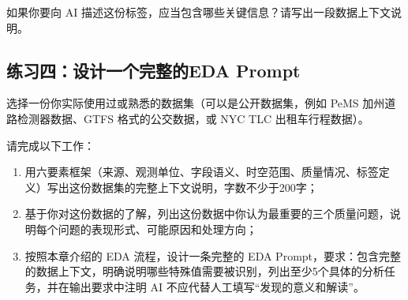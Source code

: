 如果你要向 AI 描述这份标签，应当包含哪些关键信息？请写出一段数据上下文说明。

\subsection*{练习四：设计一个完整的EDA Prompt}

选择一份你实际使用过或熟悉的数据集（可以是公开数据集，例如 PeMS 加州道路检测器数据、GTFS 格式的公交数据，或 NYC TLC 出租车行程数据）。

请完成以下工作：

\begin{enumerate}
  \item 用六要素框架（来源、观测单位、字段语义、时空范围、质量情况、标签定义）写出这份数据集的完整上下文说明，字数不少于200字；
  \item 基于你对这份数据的了解，列出这份数据中你认为最重要的三个质量问题，说明每个问题的表现形式、可能原因和处理方向；
  \item 按照本章介绍的 EDA 流程，设计一条完整的 EDA Prompt，要求：包含完整的数据上下文，明确说明哪些特殊值需要被识别，列出至少5个具体的分析任务，并在输出要求中注明 AI 不应代替人工填写“发现的意义和解读”。
\end{enumerate}





